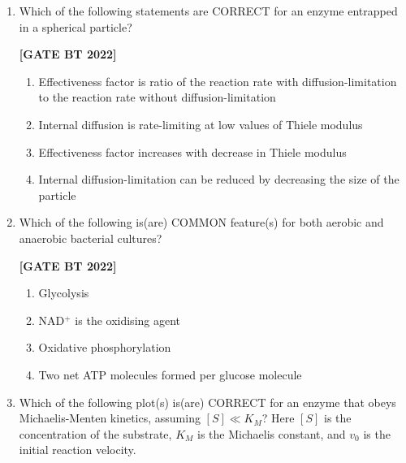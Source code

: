 \documentclass[12pt]{article}
\begin{document}
\begin{enumerate}[leftmargin=2.5em, label=\textbf{Q.\arabic*}., itemsep=2em, resume]
\item Which of the following statements are CORRECT for an enzyme entrapped in a spherical particle?

\noindent \textbf{[GATE BT 2022]}
\begin{multicols}{2}
\begin{enumerate}
    \item Effectiveness factor is ratio of the reaction rate with diffusion-limitation to the reaction rate without diffusion-limitation
    \item Internal diffusion is rate-limiting at low values of Thiele modulus
    \item Effectiveness factor increases with decrease in Thiele modulus
    \item Internal diffusion-limitation can be reduced by decreasing the size of the particle
\end{enumerate}
\end{multicols}

\item Which of the following is(are) COMMON feature(s) for both aerobic and anaerobic bacterial cultures?

\noindent \textbf{[GATE BT 2022]}
\begin{multicols}{2}
\begin{enumerate}
    \item Glycolysis
    \item NAD$^+$ is the oxidising agent
    \item Oxidative phosphorylation
    \item Two net ATP molecules formed per glucose molecule
\end{enumerate}
\end{multicols}

\item Which of the following plot(s) is(are) CORRECT for an enzyme that obeys Michaelis-Menten kinetics, assuming $[S] \ll K_M$?  
Here $[S]$ is the concentration of the substrate, $K_M$ is the Michaelis constant, and $v_0$ is the initial reaction velocity.


\end{enumerate}
\end{document}
